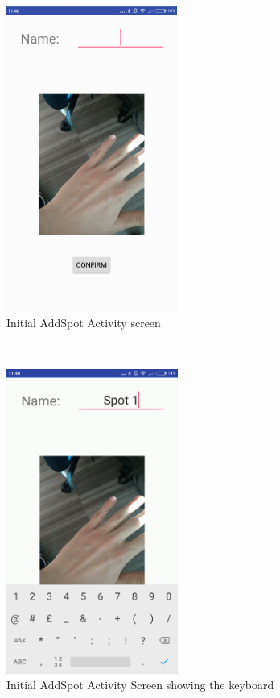 \begin{figure}[t!]
    \centering
    \begin{subfigure}[t]{0.5\textwidth}
        \centering
        \includegraphics[height=10cm]{figures/addspot1.png}
        \caption{Initial AddSpot Activity screen}
        \label{subfig:oldaddspot}
    \end{subfigure}%
        ~
    \begin{subfigure}[t]{0.5\textwidth}
        \centering
        \includegraphics[height=10cm]{figures/oldaddspotkeyboard.png}
        \caption{Initial AddSpot Activity Screen showing the keyboard}
        \label{subfig:oldaddspotkeyboard}
    \end{subfigure}
    ~
    \begin{subfigure}[t]{0.5\textwidth}

\end{subfigure}
\end{figure}
